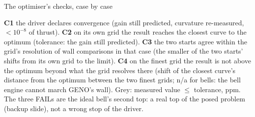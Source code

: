 \documentclass[aspectratio=169,10pt]{beamer}
\begin{document}
\begin{frame}{The optimiser's checks, case by case}
\centering
\resizebox{0.86\linewidth}{!}{}

\vspace{1.5mm}
\begin{minipage}{0.97\linewidth}\scriptsize
\textbf{C1} the driver declares convergence (gain still predicted, curvature re-measured, $<10^{-8}$ of thrust).
\textbf{C2} on its own grid the result reaches the closest curve to the optimum (tolerance: the gain still predicted).
\textbf{C3} the two starts agree within the grid's resolution of wall comparisons in that case (the smaller of the
two starts' shifts from its own grid to the limit). \textbf{C4} on the finest grid the result is not above the optimum
beyond what the grid resolves there (shift of the closest curve's distance from the optimum between the two finest grids;
n/a for bells: the bell engine cannot march GENO's wall). Grey: measured value $\le$ tolerance, ppm. The three FAILs are
the ideal bell's second top: a real top of the posed problem (backup slide), not a wrong stop of the driver.
\end{minipage}
\end{frame}
\end{document}
